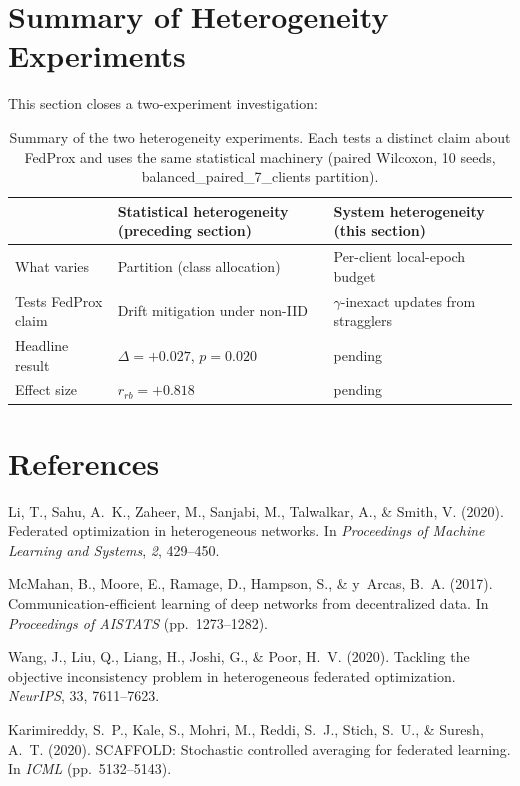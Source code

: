 \documentclass[11pt,a4paper]{article}
\newif\ifshowtodosh
\newcommand{\TODOhpcSH}[1]{%
  \ifshowtodosh\textcolor{red}{\textbf{[SH-HPC: #1]}}\else#1\fi}
\begin{document}
\section{Summary of Heterogeneity Experiments}

This section closes a two-experiment investigation:

\begin{table}[h]
\centering
\caption{Summary of the two heterogeneity experiments. Each tests a
distinct claim about FedProx and uses the same statistical machinery
(paired Wilcoxon, 10 seeds, balanced\_paired\_7\_clients partition).}
\label{tab:sh-summary}
\small
\begin{tabular}{lll}
\toprule
& Statistical heterogeneity (preceding section) & System heterogeneity (this section) \\
\midrule
What varies & Partition (class allocation) & Per-client local-epoch budget \\
Tests FedProx claim & Drift mitigation under non-IID & $\gamma$-inexact updates from stragglers \\
Headline result & $\Delta = +0.027$, $p = 0.020$ & \TODOhpcSH{pending} \\
Effect size & $r_{rb} = +0.818$ & \TODOhpcSH{pending} \\
\bottomrule
\end{tabular}
\end{table}

\section*{References}
\begin{description}\setlength{\itemsep}{2pt}
\item Li, T., Sahu, A.~K., Zaheer, M., Sanjabi, M., Talwalkar, A., \&
Smith, V. (2020). Federated optimization in heterogeneous networks. In
\textit{Proceedings of Machine Learning and Systems}, \textit{2},
429--450.
\item McMahan, B., Moore, E., Ramage, D., Hampson, S., \& y~Arcas,
B.~A. (2017). Communication-efficient learning of deep networks from
decentralized data. In \textit{Proceedings of AISTATS} (pp.\ 1273--1282).
\item Wang, J., Liu, Q., Liang, H., Joshi, G., \& Poor, H.~V. (2020).
Tackling the objective inconsistency problem in heterogeneous federated
optimization. \textit{NeurIPS}, 33, 7611--7623.
\item Karimireddy, S.~P., Kale, S., Mohri, M., Reddi, S.~J., Stich, S.~U.,
\& Suresh, A.~T. (2020). SCAFFOLD: Stochastic controlled averaging for
federated learning. In \textit{ICML} (pp.\ 5132--5143).
\end{description}
\end{document}
